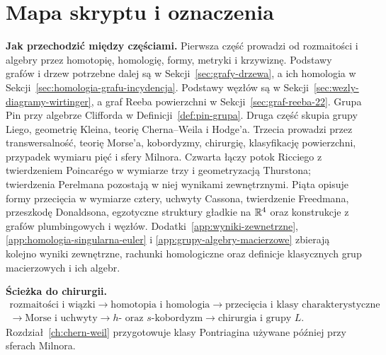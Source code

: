 \begingroup
\footnotesize\linespread{0.90}\selectfont
\setlength{\parskip}{0pt}\tableofcontents
\endgroup
\clearpage
\chapter*{Mapa skryptu i oznaczenia}

\noindent\textbf{Jak przechodzić między częściami.}
Pierwsza część prowadzi od rozmaitości i algebry przez
homotopię, homologię, formy, metryki i krzywiznę.
Podstawy grafów i drzew potrzebne dalej są w
Sekcji~\ref{sec:grafy-drzewa}, a ich homologia w
Sekcji~\ref{sec:homologia-grafu-incydencja}.
Podstawy węzłów są w Sekcji~\ref{sec:wezly-diagramy-wirtinger},
a graf Reeba powierzchni w Sekcji~\ref{sec:graf-reeba-22}.
Grupa Pin przy algebrze
Clifforda w Definicji~\ref{def:pin-grupa}.
Druga część skupia grupy Liego, geometrię Kleina,
teorię Cherna--Weila i Hodge'a.
Trzecia prowadzi przez transwersalność, teorię Morse'a,
kobordyzmy, chirurgię, klasyfikację powierzchni,
przypadek wymiaru pięć i sfery Milnora.
Czwarta łączy potok Ricciego z twierdzeniem Poincarégo
w wymiarze trzy i geometryzacją Thurstona; twierdzenia
Perelmana pozostają w niej wynikami zewnętrznymi.
Piąta opisuje formy przecięcia w wymiarze cztery,
uchwyty Cassona, twierdzenie Freedmana, przeszkodę
Donaldsona, egzotyczne struktury gładkie na $\mathbb{R}^4$
oraz konstrukcje z grafów plumbingowych i węzłów.
Dodatki~\ref{app:wyniki-zewnetrzne},
\ref{app:homologia-singularna-euler} i
\ref{app:grupy-algebry-macierzowe} zbierają kolejno
wyniki zewnętrzne, rachunki homologiczne oraz
definicje klasycznych grup macierzowych i ich algebr.

\noindent\textbf{Ścieżka do chirurgii.}
\[
\begin{gathered}
\text{rozmaitości i wiązki}
\longrightarrow \text{homotopia i homologia}
\longrightarrow \text{przecięcia i klasy charakterystyczne}\\
\longrightarrow \text{Morse i uchwyty}
\longrightarrow h\text{- oraz }s\text{-kobordyzm}
\longrightarrow \text{chirurgia i grupy }L.
\end{gathered}
\]
Rozdział~\ref{ch:chern-weil} przygotowuje klasy
Pontriagina używane później przy sferach Milnora.

